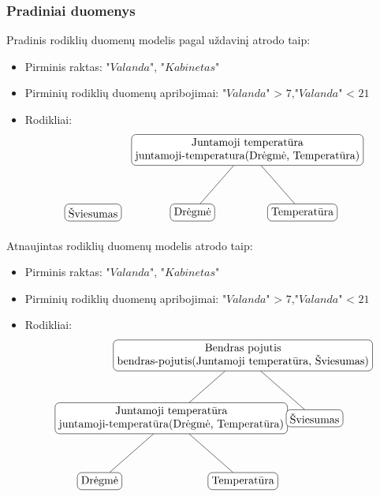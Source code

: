 \documentclass{VUMIFPSbakalaurinis}
\begin{document}
\subsubsection{Pradiniai duomenys}
\noindent Pradinis rodiklių duomenų modelis pagal uždavinį atrodo taip:
\begin{itemize}
    \item Pirminis raktas: \(\textit{"Valanda", "Kabinetas"}\)
    \item Pirminių rodiklių duomenų apribojimai: \(\textit{"Valanda" > 7},\textit{"Valanda" < 21}\) 
    \item Rodikliai:
    \[
        \begin{tikzpicture}[sibling distance=10em,
            level distance=2cm,
            every node/.style = {shape=rectangle, rounded corners,	
                                draw, align=center,	
                                top color=white, bottom color=white}]	
            \node{Šviesumas}; 	
        \end{tikzpicture}\>\>\>\>
        \begin{tikzpicture}[sibling distance=10em,
            level distance=2cm,
            every node/.style = {shape=rectangle, rounded corners,	
                                draw, align=center,	
                                top color=white, bottom color=white}]	
            \node{Juntamoji temperatūra\\juntamoji-temperatura(Drėgmė, Temperatūra)}
                    child { node {Drėgmė} }	
                    child { node {Temperatūra} } ; 	
        \end{tikzpicture} 	
    \]
\end{itemize}
Atnaujintas rodiklių duomenų modelis atrodo taip:
\begin{itemize}
    \item Pirminis raktas: \(\textit{"Valanda", "Kabinetas"}\)
    \item Pirminių rodiklių duomenų apribojimai: \(\textit{"Valanda" > 7},\textit{"Valanda" < 21}\) 
    \item Rodikliai:
    \[	
        \begin{tikzpicture}[sibling distance=13em,
            level distance=2cm,
            every node/.style = {shape=rectangle, rounded corners,	
                                draw, align=center,	
                                top color=white, bottom color=white}]	
            \node{ Bendras pojutis \\bendras-pojutis(Juntamoji temperatūra, Šviesumas)}
                child{ node {Juntamoji temperatūra\\juntamoji-temperatūra(Drėgmė, Temperatūra)}
                        child { node {Drėgmė} }	
                        child { node {Temperatūra} } }
                child {node {Šviesumas}}; 	
        \end{tikzpicture} 	
    \]
\end{itemize}
\end{document}
